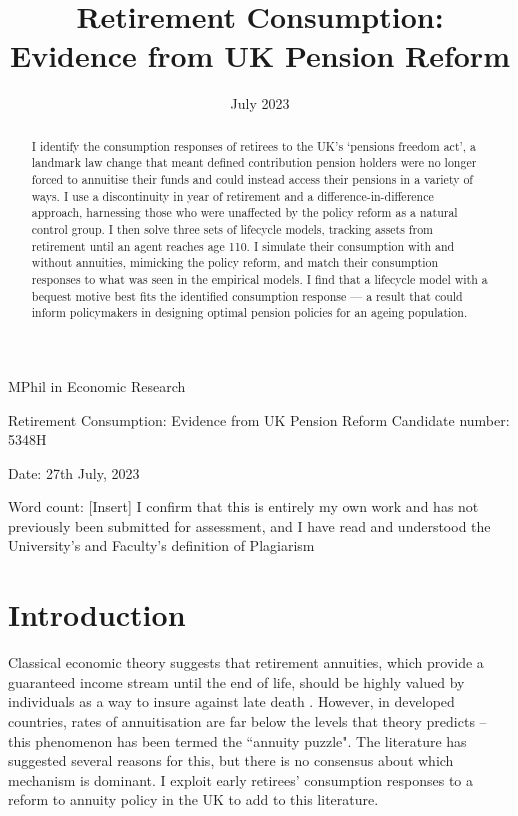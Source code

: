 \documentclass[12pt]{article}
\date{July 2023}
\title{Retirement Consumption: Evidence from UK Pension Reform}
\begin{document}
\begin{titlepage}
    \begin{center}

        \normalsize
        {MPhil in Economic Research}
        \vfill

        \huge
        Retirement Consumption: Evidence from UK Pension Reform
        \vfill
        \normalsize
        Candidate number: 5348H

        Date: 27th July, 2023

        Word count: [Insert]
        \vfill
        I confirm that this is entirely my own work and has not previously been submitted for assessment, and I have read and understood the University’s and Faculty’s definition of Plagiarism
    \end{center}
\end{titlepage}
\newpage
\maketitle
\begin{abstract}
    I identify the consumption responses of retirees to the UK's `pensions
    freedom act', a landmark law change that meant defined contribution pension
    holders were no longer forced to annuitise their funds and could instead
    access their pensions in a variety of ways. I use a discontinuity in year of
    retirement and a difference-in-difference approach, harnessing those who
    were unaffected by the policy reform as a natural control group. I then
    solve three sets of lifecycle models, tracking assets from retirement until an
    agent reaches age 110. I simulate their consumption with and without
    annuities, mimicking the policy reform, and match their consumption
    responses to what was seen in the empirical models. I find that a lifecycle
    model with a bequest motive best fits the identified consumption response —
    a result that could inform policymakers in designing optimal pension
    policies for an ageing population.
\end{abstract}
\newpage
\tableofcontents
\newpage

\section{Introduction}
Classical economic theory suggests that retirement annuities, which provide a
guaranteed income stream until the end of life, should be highly valued by
individuals as a way to insure against late death \citep{yaari_65}. However, in
developed countries, rates of annuitisation are far below the levels that theory
predicts -- this phenomenon has been termed the ``annuity puzzle". The literature
has suggested several reasons for this, but there is no consensus about which
mechanism is dominant. I exploit early retirees' consumption responses to a
reform to annuity policy in the UK to add to this literature.
\end{document}
